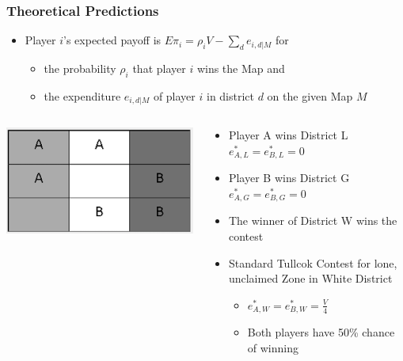 \documentclass[red]{beamer}
\begin{document}
    \begin{frame} [t]
    \frametitle{Theoretical Predictions}
    \begin{itemize}
        \item Player $i$'s expected payoff is $E\pi_i = \rho_i V - \sum_{d} e_{i,d|M}$ for
        \begin{itemize}
            \item the probability $\rho_i$ that player $i$ wins the Map and
            \item the expenditure $e_{i,d|M}$ of player $i$ in district $d$ on the given Map $M$
        \end{itemize}
    \end{itemize}
    \begin{columns}
    \begin{column}{0.25\textwidth}
    \begin{center}
    \includegraphics[scale = .4]{Symm_1_1.png}
    \end{center}
    \end{column}
    \begin{column}{0.6\textwidth}
    \begin{itemize}
        \item Player A wins District L \Rightarrow $e_{A,L}^* = e_{B,L}^* = 0$
        \item Player B wins District G \Rightarrow $e_{A,G}^* = e_{B,G}^* = 0$
        \item The winner of District W wins the contest
        \item Standard Tullcok Contest for lone, unclaimed Zone in White District
        \begin{itemize}
            \item $e_{A,W}^* = e_{B,W}^* = \frac{V}{4}$
            \item Both players have 50\% chance of winning
        \end{itemize}
    \end{itemize}
    \end{column}
    \end{columns}
    \end{frame}
\end{document}
